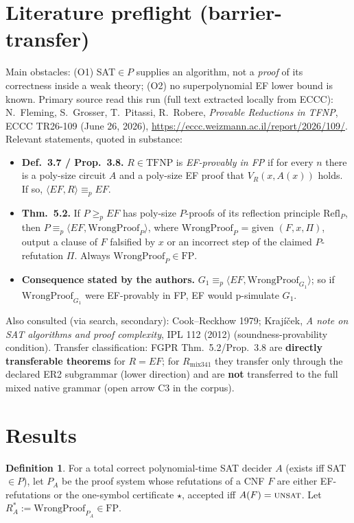 \documentclass[11pt]{article}
\theoremstyle{definition}
\newtheorem{definition}[theorem]{Definition}
\begin{document}
\section*{Literature preflight (barrier-transfer)}
Main obstacles: (O1) SAT$\in P$ supplies an algorithm, not a \emph{proof} of its correctness inside a weak theory; (O2) no superpolynomial EF lower bound is known. Primary source read this run (full text extracted locally from ECCC):
N.~Fleming, S.~Grosser, T.~Pitassi, R.~Robere, \emph{Provable Reductions in TFNP}, ECCC TR26-109 (June 26, 2026), \url{https://eccc.weizmann.ac.il/report/2026/109/}. Relevant statements, quoted in substance:
\begin{itemize}
\item \textbf{Def.~3.7 / Prop.~3.8.} $R\in\mathrm{TFNP}$ is \emph{EF-provably in FP} if for every $n$ there is a poly-size circuit $A$ and a poly-size EF proof that $V_R(x,A(x))$ holds. If so, $\langle EF,R\rangle\equiv_p EF$.
\item \textbf{Thm.~5.2.} If $P\ge_p EF$ has poly-size $P$-proofs of its reflection principle $\mathrm{Refl}_P$, then $P\equiv_p\langle EF,\mathrm{WrongProof}_P\rangle$, where $\mathrm{WrongProof}_P$ = given $(F,x,\Pi)$, output a clause of $F$ falsified by $x$ or an incorrect step of the claimed $P$-refutation $\Pi$. Always $\mathrm{WrongProof}_P\in\mathrm{FP}$.
\item \textbf{Consequence stated by the authors.} $G_1\equiv_p\langle EF,\mathrm{WrongProof}_{G_1}\rangle$; so if $\mathrm{WrongProof}_{G_1}$ were EF-provably in FP, EF would p-simulate $G_1$.
\end{itemize}
Also consulted (via search, secondary): Cook--Reckhow 1979; Krajíček, \emph{A note on SAT algorithms and proof complexity}, IPL 112 (2012) (soundness-provability condition). Transfer classification: FGPR Thm.~5.2/Prop.~3.8 are \textbf{directly transferable theorems} for $R=EF$; for $R_{\mathrm{mix341}}$ they transfer only through the declared ER2 subgrammar (lower direction) and are \textbf{not} transferred to the full mixed native grammar (open arrow C3 in the corpus).

\section*{Results}
\begin{definition}
For a total correct polynomial-time SAT decider $A$ (exists iff SAT$\in P$), let $P_A$ be the proof system whose refutations of a CNF $F$ are either EF-refutations or the one-symbol certificate $\star$, accepted iff $A(F)=\textsc{unsat}$. Let $R^\ast_A:=\mathrm{WrongProof}_{P_A}\in\mathrm{FP}$.
\end{definition}
\end{document}
